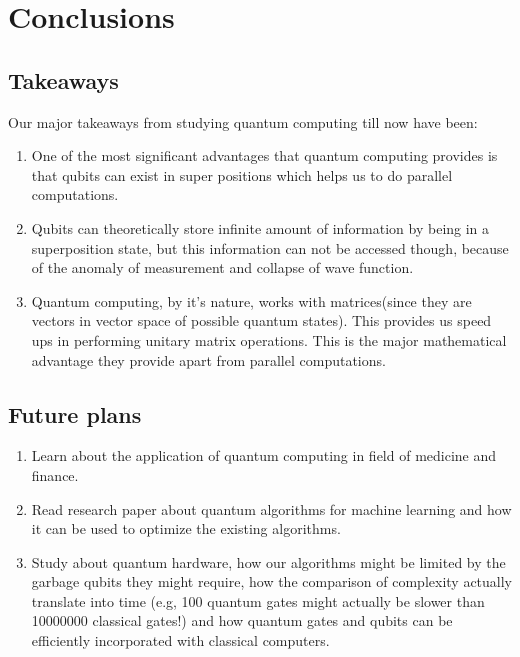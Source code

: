 \chapter{Conclusions}
\section{Takeaways}
Our major takeaways from studying quantum computing till now have been:
\begin{enumerate}
    \item One of the most significant advantages that quantum computing provides is that qubits can exist in super positions which helps us to do parallel computations.
    \item Qubits can theoretically store infinite amount of information by being in a superposition state, but this information can not be accessed though, because of the anomaly of measurement and collapse of wave function.
    \item Quantum computing, by it's nature, works with matrices(since they are vectors in vector space of possible quantum states). This provides us speed ups in performing unitary matrix operations. This is the major mathematical advantage they provide apart from parallel computations.
\end{enumerate}
\section{Future plans}
\begin{enumerate}
    \item Learn about the application of quantum computing in field of medicine and finance.
    \item Read research paper about quantum algorithms for machine learning and how it can be used to optimize the existing algorithms.
    \item Study about quantum hardware, how our algorithms might be limited by the garbage qubits they might require, how the comparison of complexity actually translate into time (e.g, 100 quantum gates might actually be slower than 10000000 classical gates!) and how quantum gates and qubits can be efficiently incorporated with classical computers.
\end{enumerate}
